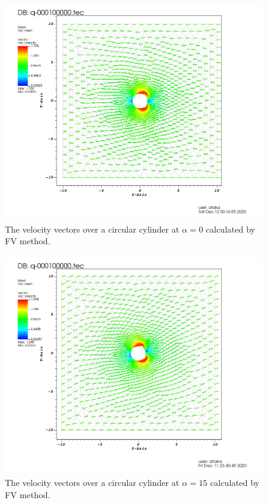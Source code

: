 \documentclass[letterpaper,12pt]{article}
\begin{document}
\newpage

\begin{figure} [!h]
	\centering
	\includegraphics[height = 9.5cm]{graph/0deg/Cylinder_0angle_vector0000.png}
	\caption{The velocity vectors over a circular cylinder at $\alpha=0$ calculated by FV method.}
    \label{fig:q2v0}
\end{figure}

\begin{figure} [!h]
	\centering
	\includegraphics[height = 9.5cm]{graph/15deg/Cylinder_15angle_vector0000.png}
	\caption{The velocity vectors over a circular cylinder at $\alpha=15$ calculated by FV method.}
    \label{fig:q2v15}
\end{figure}

\newpage
\end{document}
